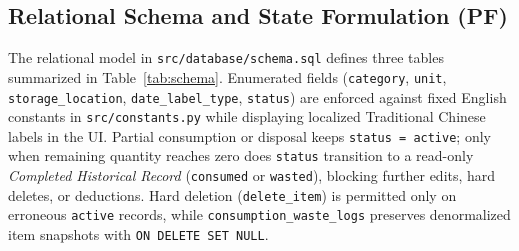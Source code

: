 \documentclass[conference]{IEEEtran}
\begin{document}
\subsection{Relational Schema and State Formulation (PF)}
The relational model in \texttt{src/database/schema.sql} defines three tables summarized in Table~\ref{tab:schema}. Enumerated fields (\texttt{category}, \texttt{unit}, \texttt{storage\_location}, \texttt{date\_label\_type}, \texttt{status}) are enforced against fixed English constants in \texttt{src/constants.py} while displaying localized Traditional Chinese labels in the UI. Partial consumption or disposal keeps \texttt{status = active}; only when remaining quantity reaches zero does \texttt{status} transition to a read-only \emph{Completed Historical Record} (\texttt{consumed} or \texttt{wasted}), blocking further edits, hard deletes, or deductions. Hard deletion (\texttt{delete\_item}) is permitted only on erroneous \texttt{active} records, while \texttt{consumption\_waste\_logs} preserves denormalized item snapshots with \texttt{ON DELETE SET NULL}.

\begin{table}[t]
\centering
\caption{SQLite 3 Relational Schema Formulation}
\label{tab:schema}
\footnotesize
\setlength{\tabcolsep}{4pt}
\end{table}
\end{document}
